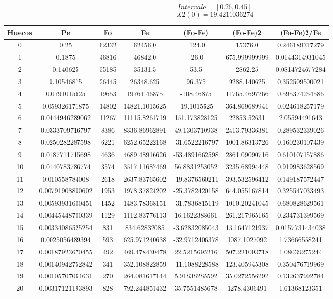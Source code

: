 \documentclass{article}
\begin{document}
$$
Intervalo = [0.25, 0.45]
$$
$$
X2(0) = 19.4211036274
$$
\begin{tabular}{|c|c|c|c|c|c|c|}
Huecos&Pe&Fo&Fe&(Fo{-}Fe)&(Fo{-}Fe)2&(Fo{-}Fe)2/Fe\\
\hline
0&0.25&62332&62456.0&{-}124.0&15376.0&0.246189317279\\
\hline
1&0.1875&46816&46842.0&{-}26.0&675.999999999&0.0144314931045\\
\hline
2&0.140625&35185&35131.5&53.5&2862.25&0.0814724677284\\
\hline
3&0.10546875&26445&26348.625&96.375&9288.140625&0.352509500021\\
\hline
4&0.0791015625&19653&19761.46875&{-}108.46875&11765.4697266&0.595374254586\\
\hline
5&0.059326171875&14802&14821.1015625&{-}19.1015625&364.869689941&0.024618257179\\
\hline
6&0.0444946289062&11267&11115.8261719&151.173828125&22853.52631&2.05594491643\\
\hline
7&0.0333709716797&8386&8336.86962891&49.1303710938&2413.79336381&0.289532339026\\
\hline
8&0.0250282287598&6221&6252.65222168&{-}31.6522216797&1001.86313726&0.160230107439\\
\hline
9&0.0187711715698&4636&4689.48916626&{-}53.4891662598&2861.09090716&0.610107157886\\
\hline
10&0.0140783786774&3574&3517.11687469&56.8831253052&3235.68994448&0.919983628569\\
\hline
11&0.010558784008&2618&2637.83765602&{-}19.8376560211&393.532596412&0.149187572447\\
\hline
12&0.00791908800602&1953&1978.37824202&{-}25.3782420158&644.055167814&0.325547033493\\
\hline
13&0.00593931600451&1452&1483.78368151&{-}31.7836815119&1010.20241045&0.680828629561\\
\hline
14&0.00445448700339&1129&1112.83776113&16.1622388661&261.217965165&0.234731399569\\
\hline
15&0.00334086525254&831&834.62832085&{-}3.62832085043&13.1647121937&0.0157731434038\\
\hline
16&0.0025056489394&593&625.971240638&{-}32.9712406378&1087.1027092&1.73666558241\\
\hline
17&0.00187923670455&492&469.478430478&22.5215695216&507.221093718&1.08039275244\\
\hline
18&0.00140942752842&341&352.108822859&{-}11.1088228588&123.405945308&0.350476719969\\
\hline
19&0.00105707064631&270&264.081617144&5.91838285592&35.0272556292&0.132637992784\\
\hline
20&0.00317121193893&828&792.244851432&35.7551485678&1278.4306491&1.61368123351\\
\end{tabular}
\end{document}
